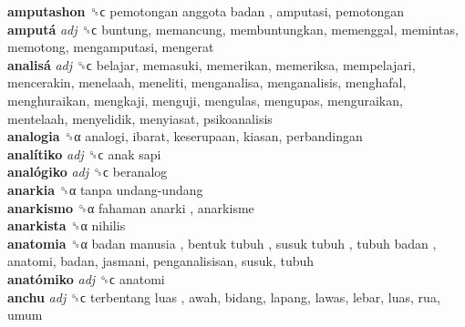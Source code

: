 \textbf{amputashon} ␝ϲ   pemotongan anggota badan , amputasi, pemotongan  \\
\textbf{amputá} \emph{adj}  ␝ϲ  buntung, memancung, membuntungkan, memenggal, memintas, memotong, mengamputasi, mengerat  \\
\textbf{analisá} \emph{adj}  ␝ϲ  belajar, memasuki, memerikan, memeriksa, mempelajari, mencerakin, menelaah, meneliti, menganalisa, menganalisis, menghafal, menghuraikan, mengkaji, menguji, mengulas, mengupas, menguraikan, mentelaah, menyelidik, menyiasat, psikoanalisis  \\
\textbf{analogia} ␝α  analogi, ibarat, keserupaan, kiasan, perbandingan  \\
\textbf{analítiko} \emph{adj}  ␝ϲ   anak sapi   \\
\textbf{analógiko} \emph{adj}  ␝ϲ  beranalog  \\
\textbf{anarkia} ␝α   tanpa undang-undang   \\
\textbf{anarkismo} ␝α   fahaman anarki , anarkisme  \\
\textbf{anarkista} ␝α  nihilis  \\
\textbf{anatomia} ␝α   badan manusia ,  bentuk tubuh ,  susuk tubuh ,  tubuh badan , anatomi, badan, jasmani, penganalisisan, susuk, tubuh  \\
\textbf{anatómiko} \emph{adj}  ␝ϲ  anatomi  \\
\textbf{anchu} \emph{adj}  ␝ϲ   terbentang luas , awah, bidang, lapang, lawas, lebar, luas, rua, umum  \\
